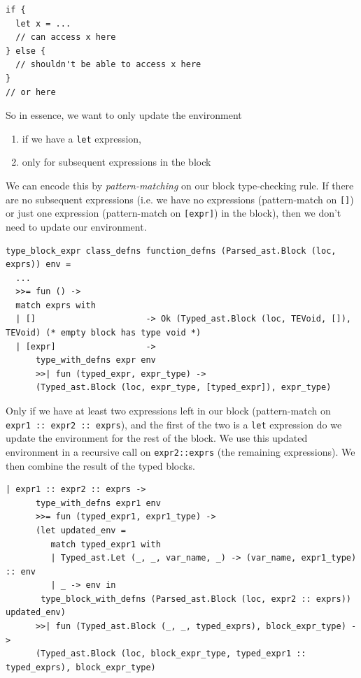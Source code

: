 {{%
%

\begin{verbatim}
if {
  let x = ...
  // can access x here
} else {
  // shouldn't be able to access x here
}
// or here
\end{verbatim}

So in essence, we want to only update the environment

\begin{enumerate}
\tightlist
\item
  if we have a \texttt{let} expression,
\item
  only for subsequent expressions in the block
\end{enumerate}

We can encode this by \emph{pattern-matching} on our block type-checking
rule. If there are no subsequent expressions (i.e. we have no
expressions (pattern-match on \texttt{{[}{]}}) or just one expression
(pattern-match on \texttt{{[}expr{]}}) in the block), then we don't need
to update our environment.


\begin{lstlisting}[language=caml]
type_block_expr class_defns function_defns (Parsed_ast.Block (loc, exprs)) env =
  ...
  >>= fun () ->
  match exprs with
  | []                      -> Ok (Typed_ast.Block (loc, TEVoid, []), TEVoid) (* empty block has type void *)
  | [expr]                  ->
      type_with_defns expr env
      >>| fun (typed_expr, expr_type) ->
      (Typed_ast.Block (loc, expr_type, [typed_expr]), expr_type)
\end{lstlisting}

Only if we have at least two expressions left in our block
(pattern-match on \texttt{expr1\ ::\ expr2\ ::\ exprs}), and the first
of the two is a \texttt{let} expression do we update the environment for
the rest of the block. We use this updated environment in a recursive
call on \texttt{expr2::exprs} (the remaining expressions). We then
combine the result of the typed blocks.


\begin{lstlisting}
| expr1 :: expr2 :: exprs ->
      type_with_defns expr1 env
      >>= fun (typed_expr1, expr1_type) ->
      (let updated_env =
         match typed_expr1 with
         | Typed_ast.Let (_, _, var_name, _) -> (var_name, expr1_type) :: env
         | _ -> env in
       type_block_with_defns (Parsed_ast.Block (loc, expr2 :: exprs)) updated_env)
      >>| fun (Typed_ast.Block (_, _, typed_exprs), block_expr_type) ->
      (Typed_ast.Block (loc, block_expr_type, typed_expr1 :: typed_exprs), block_expr_type)
\end{lstlisting}

}}
